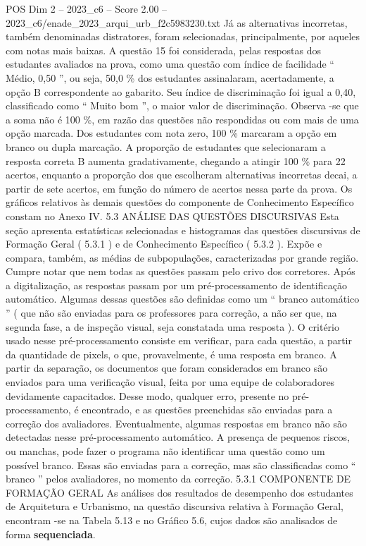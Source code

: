 \begin{textsample}{POS Dim 2 – 2023\_c6 – Score 2.00 – 2023\_c6/enade\_2023\_arqui\_urb\_f2c5983230.txt}
Já as alternativas incorretas, também denominadas distratores, foram selecionadas, principalmente, por aqueles com notas mais baixas.
A questão 15 foi considerada, pelas respostas dos estudantes avaliados na prova, como uma questão com índice de facilidade “ Médio, 0,50 ”, ou seja, 50,0 \% dos estudantes assinalaram, acertadamente, a opção B correspondente ao gabarito.
Seu índice de discriminação foi igual a 0,40, classificado como “ Muito bom ”, o maior valor de discriminação.
Observa -se que a soma não é 100 \%, em razão das questões não respondidas ou com mais de uma opção marcada.
Dos estudantes com nota zero, 100 \% marcaram a opção em branco ou dupla marcação.
A proporção de estudantes que selecionaram a resposta correta B aumenta gradativamente, chegando a atingir 100 \% para 22 acertos, enquanto a proporção dos que escolheram alternativas incorretas decai, a partir de sete acertos, em função do número de acertos nessa parte da prova.
Os gráficos relativos às demais questões do componente de Conhecimento Específico constam no Anexo IV. 5.3 ANÁLISE DAS QUESTÕES DISCURSIVAS Esta seção apresenta estatísticas selecionadas e histogramas das questões discursivas de Formação Geral ( 5.3.1 ) e de Conhecimento Específico ( 5.3.2 ).
Expõe e compara, também, as médias de subpopulações, caracterizadas por grande região.
Cumpre notar que nem todas as questões passam pelo crivo dos corretores.
Após a digitalização, as respostas passam por um pré-processamento de identificação automático.
Algumas dessas questões são definidas como um “ branco automático ” ( que não são enviadas para os professores para correção, a não ser que, na segunda fase, a de inspeção visual, seja constatada uma resposta ).
O critério usado nesse pré-processamento consiste em verificar, para cada questão, a partir da quantidade de pixels, o que, provavelmente, é uma resposta em branco.
A partir da separação, os documentos que foram considerados em branco são enviados para uma verificação visual, feita por uma equipe de colaboradores devidamente capacitados.
Desse modo, qualquer erro, presente no pré-processamento, é encontrado, e as questões preenchidas são enviadas para a correção dos avaliadores.
Eventualmente, algumas respostas em branco não são detectadas nesse pré-processamento automático.
A presença de pequenos riscos, ou manchas, pode fazer o programa não identificar uma questão como um possível branco.
Essas são enviadas para a correção, mas são classificadas como “ branco ” pelos avaliadores, no momento da correção. 5.3.1 COMPONENTE DE FORMAÇÃO GERAL As análises dos resultados de desempenho dos estudantes de Arquitetura e Urbanismo, na questão discursiva relativa à Formação Geral, encontram -se na Tabela 5.13 e no Gráfico 5.6, cujos dados são analisados de forma \textbf{sequenciada}.

\end{textsample}
